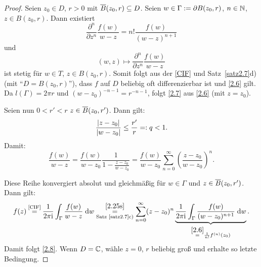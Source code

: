 \documentclass[a4paper,twoside,DIV15,BCOR12mm]{scrbook}
\begin{document}
\begin{proof}
Seien $z_0\in D$, $r > 0$ mit $\overline{B}(z_0,r)\subseteq D$. Seien $w\in\Gamma:= \partial B(z_0,r)$, $n\in\mathbb{N}$, $z\in B(z_0,r)$. Dann existiert
\[\frac{\partial^n}{\partial z^n}\frac{f(w)}{w-z} = n!\frac{f(w)}{(w-z)^{n+1}}\]
und
\[(w,z)\mapsto \frac{\partial^n}{\partial z^n}\frac{f(w)}{w-z}\]
ist stetig für $w\in T$, $z\in B(z_0,r)$. Somit folgt aus der \eqref{CIF} und Satz~\ref{satz2.7}d) (mit ``$D=B(z_0,r)$''), dass $f$ auf $D$ beliebig oft differenzierbar ist und \eqref{2.6} gilt. Da $l(\Gamma) = 2\pi r$ und $(w-z_0)^{-n-1}=r^{-n-1}$, folgt \eqref{2.7} aus \eqref{2.6} (mit $z=z_0$).

Seien nun $0<r'<r$ $z\in\overline{B}(z_0,r')$. Dann gilt:
\[\frac{\left\lvert z-z_0\right\lvert}{\left\lvert w-z_0\right\lvert}\leq\frac{r'}{r}=: q < 1.\]
Damit:
\[\label{2.25s}\frac{f(w)}{w-z}=\frac{f(w)}{w-z_0}\frac{1}{1-\frac{z-z_0}{w-z_0}} = \frac{f(w)}{w-z_0}\sum_{n=0}^\infty\left(\frac{z-z_0}{w-z_0}\right)^n.\tag{$*$}\]

Diese Reihe konvergiert absolut und gleichmäßig für $w\in\Gamma$ und $z\in\overline{B}(z_0,r')$. Dann gilt:
\[f(z)\!\!\nach{=}{\eqref{CIF}}\!\! \frac{1}{2\pi\i}\integral{\Gamma}{}{\frac{f(w)}{w-z}}{w} \underset{\text{Satz~\ref{satz2.7}c)}}{\overset{\eqref{2.25s}}{=}} \sum_{n=0}^\infty (z-z_0)^n\underbrace{\frac{1}{2\pi\i}\integral{\Gamma}{}{\frac{f(w)}{(w-z_0)^{n+1}}}{w}}_{\overset{\eqref{2.6}}{=}\frac{1}{n!}f^{(n)}(z_0)}.\]
Damit folgt \eqref{2.8}. Wenn $D=\mathbb{C}$, wähle $z =0$, $r$ beliebig groß und erhalte so letzte Bedingung.
\end{proof}
\end{document}
